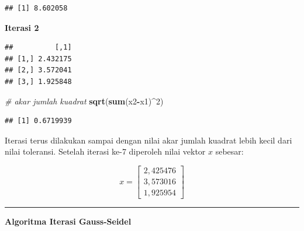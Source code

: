 \documentclass[]{book}
\newenvironment{Shaded}{\begin{snugshade}}{\end{snugshade}}
\newcommand{\CommentTok}[1]{\textcolor[rgb]{0.56,0.35,0.01}{\textit{#1}}}
\newcommand{\DecValTok}[1]{\textcolor[rgb]{0.00,0.00,0.81}{#1}}
\newcommand{\KeywordTok}[1]{\textcolor[rgb]{0.13,0.29,0.53}{\textbf{#1}}}
\newcommand{\NormalTok}[1]{#1}
\newcommand{\OperatorTok}[1]{\textcolor[rgb]{0.81,0.36,0.00}{\textbf{#1}}}
\newcommand{\StringTok}[1]{\textcolor[rgb]{0.31,0.60,0.02}{#1}}
\theoremstyle{definition}
\theoremstyle{definition}
\theoremstyle{definition}
\theoremstyle{remark}
\begin{document}
\begin{verbatim}
## [1] 8.602058
\end{verbatim}

\textbf{Iterasi 2}

\begin{Shaded}
\end{Shaded}

\begin{verbatim}
##          [,1]
## [1,] 2.432175
## [2,] 3.572041
## [3,] 1.925848
\end{verbatim}

\begin{Shaded}
\begin{Highlighting}[]
\CommentTok{# akar jumlah kuadrat}
\KeywordTok{sqrt}\NormalTok{(}\KeywordTok{sum}\NormalTok{(x2}\OperatorTok{-}\NormalTok{x1)}\OperatorTok{^}\DecValTok{2}\NormalTok{)}
\end{Highlighting}
\end{Shaded}

\begin{verbatim}
## [1] 0.6719939
\end{verbatim}

Iterasi terus dilakukan sampai dengan nilai akar jumlah kuadrat lebih kecil dari nilai toleransi. Setelah iterasi ke-7 diperoleh nilai vektor \(x\) sebesar:

\[
x = \begin{bmatrix}
     2,425476     \\[0.3em]
     3,573016     \\[0.3em]
     1,925954
\end{bmatrix}
\]

\begin{center}\rule{0.5\linewidth}{\linethickness}\end{center}

\textbf{Algoritma Iterasi Gauss-Seidel}
\end{document}
